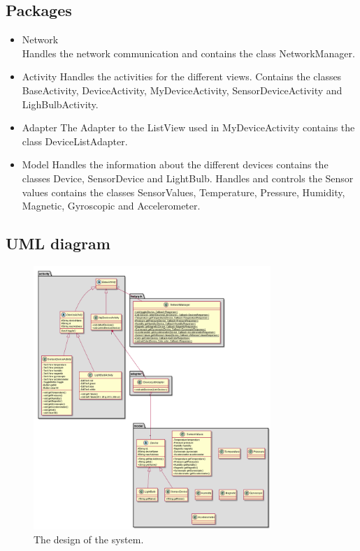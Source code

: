 \documentclass[a4paper]{article}
\begin{document}
	\subsection{Packages}
	\begin{itemize}
		\item Network \\
        Handles the network communication and contains the class NetworkManager.
		\item Activity
        Handles the activities for the different views. Contains the classes BaseActivity, DeviceActivity, MyDeviceActivity, SensorDeviceActivity and LighBulbActivity.
		\item Adapter
        The Adapter to the ListView used in MyDeviceActivity contains the class DeviceListAdapter.
		\item Model
        Handles the information about the different devices contains the classes Device, SensorDevice and LightBulb. Handles and controls the Sensor values contains the classes SensorValues, Temperature, Pressure, Humidity, Magnetic, Gyroscopic and Accelerometer.
	\end{itemize}
\subsection{UML diagram}
	\begin{figure}[H]
    \centering
    \includegraphics[width=0.8\textwidth]{class_diagram.png}
    \caption{The design of the system.}
    \label{fig:uml}
\end{figure}
\end{document}
